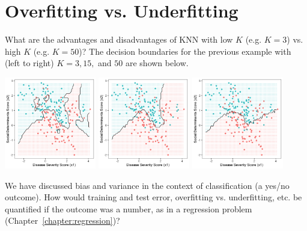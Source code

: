 \section{Overfitting vs. Underfitting}

\begin{question}{}
What are the advantages and disadvantages of KNN with low $K$ (e.g. $K=3$) vs. high $K$ (e.g. $K=50$)? The decision boundaries for the previous example with (left to right) $K=3, 15,$ and $50$ are shown below.
\begin{center}
\includegraphics[width=0.3\textwidth]{img/esl-knn-3.png}
\includegraphics[width=0.3\textwidth]{img/esl-knn-15.png}
\includegraphics[width=0.3\textwidth]{img/esl-knn-50.png}
\end{center}
\end{question}

\begin{question}{}
We have discussed bias and variance in the context of classification (a yes/no outcome). How would training and test error, overfitting vs. underfitting, etc. be quantified if the outcome was a number, as in a regression problem (Chapter~\ref{chapter:regression})?
\end{question}
